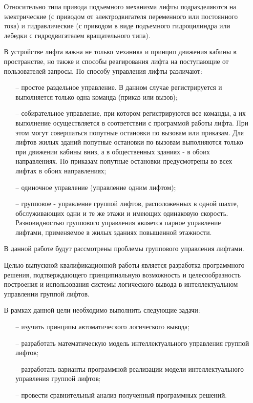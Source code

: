 	Относительно типа привода подъемного механизма лифты подразделяются на электрические
		(с приводом от электродвигателя пе­ременного или постоянного тока)
		и гидравлические (с приводом в виде подъемного гидроцилиндра или лебедки с гидродвига­телем вращательного типа).

	В устройстве лифта важна не только механика и принцип движения кабины в пространстве,
		но также и способы реагирования лифта на поступающие от пользователей запросы.
		По способу управления лифты различают:
		\begin{itemize}
			\item[--] простое раздельное управление. В данном случае регистрируется
				и выполняется только одна команда (приказ или вызов);
			\item[--] собирательное управление, при котором регистрируются все команды,
				а их выполнение осуществляется в соответствии с программой работы лифта.
				При этом могут совершаться попутные остановки по вызовам или приказам.
				Для лифтов жилых зданий попутные остановки по вызовам выполняются только
				при движении кабины вниз, а в общественных зданиях - в обоих направлениях.
				По приказам попутные остановки предусмотрены во всех лифтах в обоих направлениях;
			\item[--] одиночное управление (управление одним лифтом);
			\item[--] групповое - управление группой лифтов, расположенных в одной шахте,
				обслуживающих одни и те же этажи и имеющих одинаковую скорость.
				Разновидностью группового управления является парное управление лифтами,
				применяемое в жилых зданиях повышенной этажности.
		\end{itemize}

	В данной работе будут рассмотрены проблемы группового управления лифтами.

	Целью выпускной квалификационной работы является разработка программного решения,
		подтверждающего принципиальную возможность и целесообразность построения
		и использования системы логического вывода в интеллектуальном управлении группой лифтов.

	В рамках данной цели необходимо выполнить следующие задачи:
		\begin{itemize}
			\item[--] изучить принципы автоматического логического вывода;
			\item[--] разработать математическую модель интеллектуального управления группой лифтов;
			\item[--] разработать варианты программной реализации модели интеллектуального управления группой лифтов;
			\item[--] провести сравнительный анализ полученный программных решений.
		\end{itemize}
